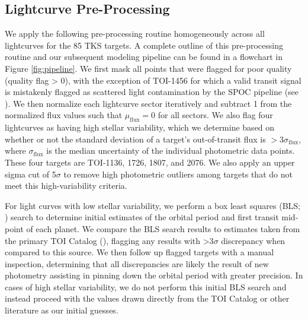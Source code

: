 \documentclass[twocolumn]{aastex63}
\begin{document}
\subsection{Lightcurve Pre-Processing}
\label{sec:preprocessing}

We apply the following pre-processing routine homogeneously across all lightcurves for the 85 TKS targets. A complete outline of this pre-processing routine and our subsequent modeling pipeline can be found in a flowchart in Figure \ref{fig:pipeline}. We first mask all points that were flagged for poor quality (quality flag > 0), with the exception of TOI-1456 for which a valid transit signal is mistakenly flagged as scattered light contamination by the SPOC pipeline (see \citealt{Dalba20}). We then normalize each lightcurve sector iteratively and subtract 1 from the normalized flux values such that $\mu_\textrm{flux} = 0$ for all sectors. We also flag four lightcurves as having high stellar variability, which we determine based on whether or not the standard deviation of a target's out-of-transit flux is $>$3$\sigma_\textrm{flux}$, where $\sigma_\textrm{flux}$ is the median uncertainty of the individual photometric data points. These four targets are TOI-1136, 1726, 1807, and 2076. We also apply an upper sigma cut of 5$\sigma$ to remove high photometric outliers among targets that do not meet this high-variability criteria.

For light curves with low stellar variability, we perform a box least squares (BLS; \citealt{Kovacs02}) search to determine initial estimates of the orbital period and first transit mid-point of each planet. We compare the BLS search results to estimates taken from the primary TOI Catalog (\citealt{toi}), flagging any results with >3$\sigma$ discrepancy when compared to this source. We then follow up flagged targets with a manual inspection, determining that all discrepancies are likely the result of new photometry assisting in pinning down the orbital period with greater precision. In cases of high stellar variability, we do not perform this initial BLS search and instead proceed with the values drawn directly from the TOI Catalog or other literature as our initial guesses.
\end{document}
